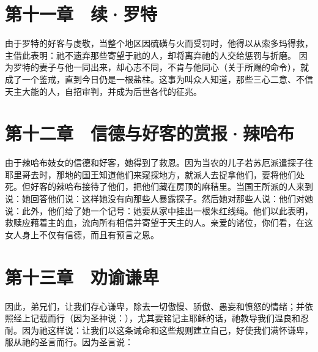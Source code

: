 
\section{第十一章　续·罗特}

由于罗特的好客与虔敬，当整个地区因硫磺与火而受罚时，他得以从索多玛得救，主借此表明：祂不遗弃那些寄望于祂的人，却将离弃祂的人交给惩罚与折磨。 因为罗特的妻子与他一同出来，却心志不同，不肯与他同心（关于所赐的命令），就成了一个鉴戒，直到今日仍是一根盐柱。这事为叫众人知道，那些三心二意、不信天主大能的人，自招审判，并成为后世各代的征兆。\par


\section{第十二章　信德与好客的赏报·辣哈布}

由于辣哈布妓女的信德和好客，她得到了救恩。因为当农的儿子若苏厄派遣探子往耶里哥去时，那地的国王知道他们来窥探地方，就派人去捉拿他们，要将他们处死。但好客的辣哈布接待了他们，把他们藏在房顶的麻秸里。当国王所派的人来到说：她回答他们说：这样她没有向那些人暴露探子。然后她对那些人说：他们对她说：此外，他们给了她一个记号：她要从家中挂出一根朱红线绳。他们以此表明，救赎应藉着主的血，流向所有相信并寄望于天主的人。亲爱的诸位，你们看，在这女人身上不仅有信德，而且有预言之恩。\par


\section{第十三章　劝谕谦卑}

因此，弟兄们，让我们存心谦卑，除去一切傲慢、骄傲、愚妄和愤怒的情绪；并依照经上记载而行（因为圣神说：），尤其要铭记主耶稣的话，祂教导我们温良和忍耐。因为祂这样说：让我们以这条诫命和这些规则建立自己，好使我们满怀谦卑，服从祂的圣言而行。因为圣言说：\par

